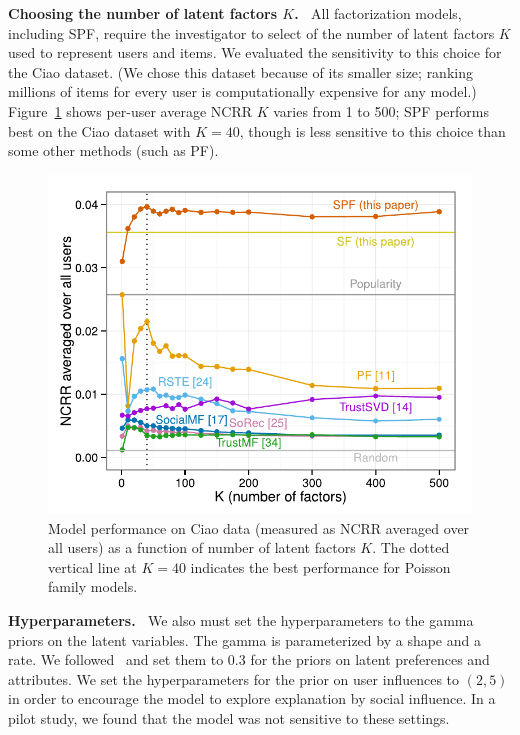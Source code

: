 \documentclass{sig-alternate-2013}
\newcommand{\mypar}[1]{\vspace{0.05in} \noindent \textbf{#1 \,}}
\begin{document}
\mypar{Choosing the number of latent factors $K$.}  All factorization
models, including SPF, require the investigator to select of the
number of latent factors $K$ used to represent users and items.  We
evaluated the sensitivity to this choice for the Ciao dataset.  (We
chose this dataset because of its smaller size; ranking millions of
items for every user is computationally expensive for any model.)
Figure~\ref{fig:KsweepC} shows per-user average NCRR $K$ varies from 1
to 500; SPF performs best on the Ciao dataset with $K=40$, though is
less sensitive to this choice than some other methods (such as PF).

\begin{figure}[ht]
\hspace{-7px}
\includegraphics[width=\columnwidth]{../fig/k_sweep_Ciao.pdf}
\caption{Model performance on Ciao data (measured as NCRR averaged
  over all users) as a function of number of latent factors $K$.  The
  dotted vertical line at $K=40$ indicates the best performance for
  Poisson family models.}\label{fig:KsweepC}
\end{figure}

\mypar{Hyperparameters.}  We also must set the hyperparameters to the
gamma priors on the latent variables. The gamma is parameterized by a
shape and a rate.  We followed~\cite{poisMF} and set them to 0.3 for
the priors on latent preferences and attributes.  We set the
hyperparameters for the prior on user influences to $(2, 5)$ in order
to encourage the model to explore explanation by social influence.  In
a pilot study, we found that the model was not sensitive to these
settings.
\end{document}

